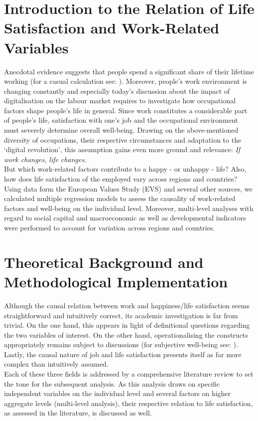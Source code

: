 \documentclass[preprint,12pt,authoryear]{elsarticle}
\begin{document}
	\section{Introduction to the Relation of Life Satisfaction and Work-Related Variables}
	Anecdotal evidence suggests that people spend a significant share of their lifetime working (for a casual calculation 
	see: \citet{thompson_what_2016}). Moreover, people's work environment is changing constantly and especially today's 
	discussion about the impact of digitalisation on the labour market requires to investigate how occupational factors shape 
	people's life in general. Since work constitutes a considerable part of people’s life, satisfaction with one’s job and the
	occupational environment must severely determine overall well-being. Drawing on the above-mentioned diversity of 
	occupations, their respective circumstances and adaptation to the ‘digital revolution’, this assumption gains even more 
	ground and relevance: \textit{If work changes, life changes.} \\
	But which work-related factors contribute to a happy - or unhappy - life? Also, how does life satisfaction of the employed
	vary across regions and countries? \\
	Using data form the European Values Study (EVS) and several other sources, we calculated multiple regression models to assess the causality of work-related factors and well-being on the individual level. Moreover, multi-level analyses with regard to social capital and
	macroeconomic as well as developmental indicators were performed to account for variation across regions and countries. 
		
	\section{Theoretical Background and Methodological Implementation}
	Although the causal relation between work and happiness/life satisfaction seems straightforward and intuitively correct,
	its academic investigation is far from trivial. On the one hand, this appears in light of definitional questions regarding the 
	two variables of interest. On the other hand, operationalising the constructs appropriately remains subject to discussions
	(for subjective well-being see: \citet{kahneman_developments_2006,layard_measuring_2010}). Lastly, the causal nature of job and life
	satisfaction presents itself as far more complex than intuitively assumed. \\
	Each of these three fields is addressed by a comprehensive literature review to set the tone for the subsequent analysis.
	As this analysis draws on specific independent variables on the individual level and several factors on higher aggregate
	levels (multi-level analysis), their respective relation to life satisfaction, as assessed in the literature, is discussed as well.
	
\end{document}
